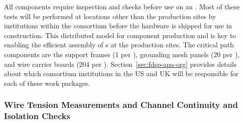 All components require inspection and  checks before use on an .  Most of these tests will be performed at locations other than the  production sites by institutions within the consortium before the hardware is shipped for use in  construction. This distributed model for component production and  is key to enabling the efficient assembly of s at the production sites.   The critical path components are the support frames (1 per ), grounding mesh panels (20 per ), and wire carrier boards (204 per ). Section~\ref{sec:fdsp-apa-org} provides details about which consortium institutions in the US and UK will be responsible for each of these work packages.  

\begin{comment}
\begin{itemize}

\item Wire testing: The CuBe wire is provided on spools from the supplier. Samples from each spool are strength tested before use on an \dword{apa}.

\item Circuit boards: All circuit boards installed on an \dword{apa} are inspected for dimensional accuracy before being routed through various epoxy and cleaning processes as they are prepped for assembly. Inspection results are documented, and if anomalies are found, an electronic non-conformance report is written.  

\item \dword{cr} and $G$-plane bias board testing: Acceptance tests of these boards include leakage current measurements ($<$\SI{0.5}{nA}) and continuity tests on each channel.  The tests are performed at room temperature. \dword{pdsp} was used to perform design validation on more than \num{100} boards that were cycled and tested at \lntwo temperature. No failures were seen during these tests. 
\end{itemize}
\end{comment}

\subsubsection{Wire Tension Measurements and Channel Continuity and Isolation Checks}
\label{sec:fdsp-apa-prod-qa-tension}

